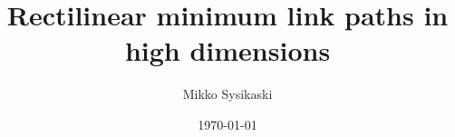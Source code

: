 \documentclass[english,gradu]{tktltiki2018}
\begin{document}
\newcommand\nodecs[1]{\ensuremath{\textsc{ivc}(#1)}\xspace}
\newcommand\nodeps[1]{\ensuremath{\textsc{ivp}(#1)}\xspace}
\newcommand\subtree[1]{\ensuremath{\texttt{subtree}(#1)}\xspace}
\newcommand\subtreep[1]{\ensuremath{\texttt{subtreeP}(#1)}\xspace}
\newcommand\hasrect[1]{\ensuremath{\texttt{hasrect}(#1)}\xspace}
\newcommand\hasbits[2]{\ensuremath{\texttt{hasbits}(#1)[#2]}\xspace}
\newcommand\hasbita[1]{\ensuremath{\texttt{hasbits}(#1)}\xspace}

\newcommand\rect[1]{\ensuremath{\textsc{rect}(#1)}\xspace}

\newcommand\pop[1]{\ensuremath{\textsc{pop}(#1)}\xspace}

\newcommand\y[1]{\ensuremath{{#1}_y}\xspace}
\newcommand\x[1]{\ensuremath{{#1}_x}\xspace}
\newcommand\xrange[1]{\ensuremath{x(#1)}\xspace}
\newcommand\yrange[1]{\ensuremath{y(#1)}\xspace}
\newcommand\zrange[1]{\ensuremath{z(#1)}\xspace}
\newcommand\xranget[2]{\ensuremath{x(#1)_{#2}}\xspace}
\newcommand\yranget[2]{\ensuremath{y(#1)_{#2}}\xspace}
\newcommand\nbs[1]{\ensuremath{\textsc{nbs}{(#1)}}\xspace}
\newcommand\nbsd[2]{\ensuremath{\textsc{nbs}_{#2}{(#1)}}\xspace}
\newcommand\obsd[2]{\ensuremath{\textsc{obs}_{#2}{(#1)}}\xspace}

\newcommand\decomp[1]{\ensuremath{\textsc{dec}_{#1}}\xspace}
\newcommand\sweep[2]{\ensuremath{\textsc{sweep}_{#2}{(#1)}}\xspace}
\newcommand\stepof[1]{\ensuremath{\textsc{step}{(#1)}}\xspace}
\newcommand\proj[2]{\ensuremath{\text{proj}_{#1}(#2)}\xspace}

\newcommand\rotr[1]{\ensuremath{\top #1}\xspace}
\newcommand\vecof[1]{\ensuremath{\left [#1\right ]}\xspace}
\newcommand\sline[1]{\ensuremath{S_{#1}}\xspace}
\newcommand\intert[2]{\ensuremath{\textsc{interval}_{#1}(#2)}\xspace}
\newcommand\point[1]{\ensuremath{\left ({#1}\right )}\xspace}

\newcommand\cellE{\ensuremath{\mathsf{CellEvent}}\xspace}
\newcommand\cellEs{\ensuremath{\mathsf{CellEvent}}s\xspace}
\newcommand\obsE{\ensuremath{\mathsf{ObstacleEvent}}\xspace}
\newcommand\obsEs{\ensuremath{\mathsf{ObstacleEvent}}s\xspace}
\newcommand\addE{\ensuremath{\mathsf{AddRangeEvent}}\xspace}
\newcommand\addEs{\ensuremath{\mathsf{AddRangeEvent}}s\xspace}
\newcommand\cellof[1]{\ensuremath{\text{cell}(#1)}\xspace}
\newcommand\rectof[1]{\ensuremath{\text{rect}(#1)}\xspace}
\newcommand\hrectof[1]{\ensuremath{\text{hyperrect}(#1)}\xspace}


\title{Rectilinear minimum link paths in high dimensions}
\author{Mikko Sysikaski}
\date{\today}
\end{document}
